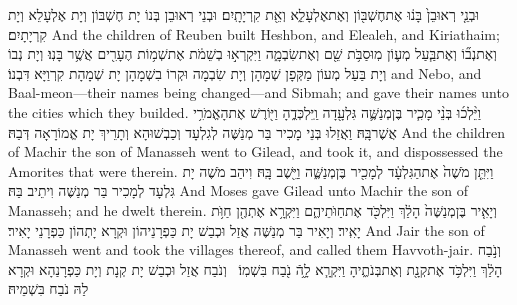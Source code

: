 {וּבְנֵ֤י רְאוּבֵן֙ בָּנ֔וּ אֶת\maqqaf חֶשְׁבּ֖וֹן וְאֶת\maqqaf אֶלְעָלֵ֑א וְאֵ֖ת קִרְיָתָֽיִם׃}
{וּבְנֵי רְאוּבֵן בְּנוֹ יָת חֶשְׁבּוֹן וְיָת אֶלְעָלֵא וְיָת קִרְיָתָיִם׃}
{And the children of Reuben built Heshbon, and Elealeh, and Kiriathaim;}{}
{וְאֶת\maqqaf נְב֞וֹ וְאֶת\maqqaf בַּ֧עַל מְע֛וֹן מֽוּסַבֹּ֥ת שֵׁ֖ם וְאֶת\maqqaf שִׂבְמָ֑ה וַיִּקְרְא֣וּ בְשֵׁמֹ֔ת אֶת\maqqaf שְׁמ֥וֹת הֶעָרִ֖ים אֲשֶׁ֥ר בָּנֽוּ׃}
{וְיָת נְבוֹ וְיָת בַּעַל מְעוֹן מַקְּפָן שְׁמָהָן וְיָת שִׂבְמָה וּקְרוֹ בִשְׁמָהָן יָת שְׁמָהָת קִרְוַיָּא דִּבְנוֹ׃}
{and Nebo, and Baal-meon—their names being changed—and Sibmah; and gave their names unto the cities which they builded.}{}
{וַיֵּ֨לְכ֜וּ בְּנֵ֨י מָכִ֧יר בֶּן\maqqaf מְנַשֶּׁ֛ה גִּלְעָ֖דָה וַֽיִּלְכְּדֻ֑הָ וַיּ֖וֹרֶשׁ אֶת\maqqaf הָאֱמֹרִ֥י אֲשֶׁר\maqqaf בָּֽהּ׃}
{וַאֲזַלוּ בְּנֵי מָכִיר בַּר מְנַשֶּׁה לְגִלְעָד וְכַבְשׁוּהָא וְתָרֵיךְ יָת אֱמוֹרָאָה דְּבַהּ׃}
{And the children of Machir the son of Manasseh went to Gilead, and took it, and dispossessed the Amorites that were therein.}{}
{וַיִּתֵּ֤ן מֹשֶׁה֙ אֶת\maqqaf הַגִּלְעָ֔ד לְמָכִ֖יר בֶּן\maqqaf מְנַשֶּׁ֑ה וַיֵּ֖שֶׁב בָּֽהּ׃}
{וִיהַב מֹשֶׁה יָת גִּלְעָד לְמָכִיר בַּר מְנַשֶּׁה וִיתֵיב בַּהּ׃}
{And Moses gave Gilead unto Machir the son of Manasseh; and he dwelt therein.}{}
{וְיָאִ֤יר בֶּן\maqqaf מְנַשֶּׁה֙ הָלַ֔ךְ וַיִּלְכֹּ֖ד אֶת\maqqaf חַוֺּתֵיהֶ֑ם וַיִּקְרָ֥א אֶתְהֶ֖ן חַוֺּ֥ת יָאִֽיר׃}
{וְיָאִיר בַּר מְנַשֶּׁה אֲזַל וּכְבַשׁ יָת כַּפְרָנֵיהוֹן וּקְרָא יָתְהוֹן כַּפְרָנֵי יָאִיר׃}
{And Jair the son of Manasseh went and took the villages thereof, and called them Havvoth-jair.}{}
{וְנֹ֣בַח הָלַ֔ךְ וַיִּלְכֹּ֥ד אֶת\maqqaf קְנָ֖ת וְאֶת\maqqaf בְּנֹתֶ֑יהָ וַיִּקְרָ֧א לָ֦הֿ נֹ֖בַח בִּשְׁמֽוֹ׃ \petucha }
{וְנֹבַח אֲזַל וּכְבַשׁ יָת קְנָת וְיָת כַּפְרָנַהָא וּקְרָא לַהּ נֹבַח בִּשְׁמֵיהּ׃}
